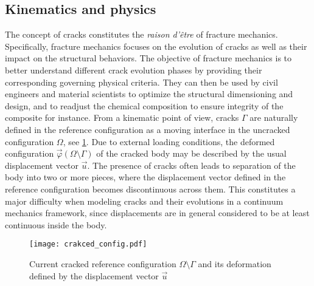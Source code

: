 \subsection{Kinematics and physics}
The concept of cracks constitutes the \emph{raison d'être} of fracture mechanics. Specifically, fracture mechanics focuses on the evolution of cracks as well as their impact on the structural behaviors. The objective of fracture mechanics is to better understand different crack evolution phases by providing their corresponding governing physical criteria. They can then be used by civil engineers and material scientists to optimize the structural dimensioning and design, and to readjust the chemical composition to ensure integrity of the composite for instance. From a kinematic point of view, cracks $\Gamma$ are naturally defined in the reference configuration as a moving interface in the uncracked configuration $\Omega$, see \cref{fig:crackedconfig}. Due to external loading conditions, the deformed configuration $\vec{\varphi}(\Omega\setminus\Gamma)$ of the cracked body may be described by the usual displacement vector $\vec{u}$. The presence of cracks often leads to separation of the body into two or more pieces, where the displacement vector defined in the reference configuration becomes discontinuous across them. This constitutes a major difficulty when modeling cracks and their evolutions in a continuum mechanics framework, since displacements are in general considered to be at least continuous inside the body.
\begin{figure}[htbp]
\centering
\texttt{[image: crakced\_config.pdf]}
\caption{Current cracked reference configuration $\Omega\setminus\Gamma$ and  its deformation defined by the displacement vector $\vec{u}$} \label{fig:crackedconfig}
\end{figure}

